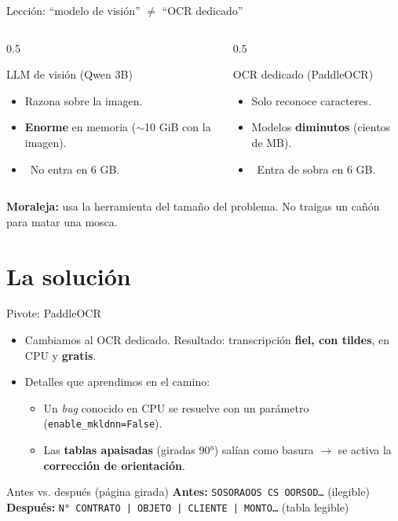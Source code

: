 \documentclass[10pt,aspectratio=169]{beamer}
\newcommand{\si}{\textcolor{ok}{\ding{51}}}
\newcommand{\no}{\textcolor{mal}{\ding{55}}}
\begin{document}
\begin{frame}{Lección: ``modelo de visión'' $\neq$ ``OCR dedicado''}
  \begin{columns}
    \begin{column}{0.5\textwidth}
      \begin{block}{LLM de visión (Qwen 3B)}
        \begin{itemize}
          \item Razona sobre la imagen.
          \item \textbf{Enorme} en memoria ($\sim$10 GiB con la imagen).
          \item \no\ No entra en 6 GB.
        \end{itemize}
      \end{block}
    \end{column}
    \begin{column}{0.5\textwidth}
      \begin{block}{OCR dedicado (PaddleOCR)}
        \begin{itemize}
          \item Solo reconoce caracteres.
          \item Modelos \textbf{diminutos} (cientos de MB).
          \item \si\ Entra de sobra en 6 GB.
        \end{itemize}
      \end{block}
    \end{column}
  \end{columns}
  \vfill
  \centering\textbf{Moraleja:} usa la herramienta del tamaño del problema. No traigas un cañón para matar una mosca.
\end{frame}

\section{La solución}

\begin{frame}{Pivote: PaddleOCR}
  \begin{itemize}
    \item Cambiamos al OCR dedicado. Resultado: transcripción \textbf{fiel, con tildes}, en CPU y \textbf{gratis}.
    \item Detalles que aprendimos en el camino:
    \begin{itemize}
      \item Un \emph{bug} conocido en CPU se resuelve con un parámetro (\texttt{enable\_mkldnn=False}).
      \item Las \textbf{tablas apaisadas} (giradas 90°) salían como basura $\rightarrow$ se activa la \textbf{corrección de orientación}.
    \end{itemize}
  \end{itemize}
  \begin{exampleblock}{Antes vs. después (página girada)}
    \footnotesize
    \textbf{Antes:} \texttt{SOSORAOOS CS OORSOD\ldots} (ilegible)\\
    \textbf{Después:} \texttt{N° CONTRATO | OBJETO | CLIENTE | MONTO\ldots} (tabla legible)
  \end{exampleblock}
\end{frame}
\end{document}
